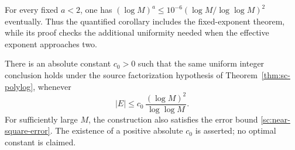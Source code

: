 For every fixed \(a<2\), one has
\((\log M)^a\le10^{-6}(\log M/\log\log M)^2\) eventually.
Thus the quantified corollary includes the fixed-exponent theorem,
while its proof checks the additional uniformity needed when the
effective exponent approaches two.

\begin{corollary}
\label{cor:sc-chebyshev-core}
There is an absolute constant \(c_0>0\) such that the same uniform
integer conclusion holds under the source factorization hypothesis
of Theorem~\ref{thm:sc-polylog}, whenever
\begin{equation}
 |E|\le c_0\,\frac{(\log M)^2}{\log\log M}.
 \label{sc:chebyshev-core-size}
\end{equation}
For sufficiently large \(M\), the construction also satisfies the
error bound \eqref{sc:near-square-error}.
The existence of a positive absolute \(c_0\) is asserted; no optimal
constant is claimed.
\end{corollary}

